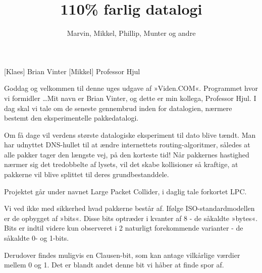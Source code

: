 \documentclass[a4paper,11pt]{article}
\title{110\%  farlig datalogi}
\author{Marvin, Mikkel, Phillip, Munter og andre}
\begin{document}
\maketitle

\begin{roles}
[Klaes] Brian Vinter
[Mikkel] Professor Hjul
\end{roles}

\begin{props}
\end{props}


\begin{sketch}


 Goddag og velkommen til denne uges udgave af »Viden.COM«. Programmet hvor vi formidler \ldots Mit navn er Brian Vinter, og dette er min kollega, Professor Hjul. I dag skal vi tale om de seneste gennembrud inden for datalogien, nærmere bestemt den eksperimentelle pakkedatalogi.

 Om få dage vil verdens største datalogiske eksperiment til dato blive tændt. Man har udnyttet DNS-hullet til at ændre internettets routing-algoritmer, således at alle pakker tager den længste vej, på den korteste tid! Når pakkernes hastighed nærmer sig det tredobbelte af lysets, vil det skabe kollisioner så kraftige, at pakkerne vil blive splittet til deres grundbestanddele.


 Projektet går under navnet Large Packet Collider, i daglig tale forkortet LPC.

 Vi ved ikke med sikkerhed hvad pakkerne består af. Ifølge ISO-standardmodellen er de opbygget af »bits«. Disse bits optræder i kvanter af 8 - de såkaldte »bytes«. Bits er indtil videre kun observeret i 2 naturligt forekommende varianter - de såkaldte 0- og 1-bits.

 Derudover findes muligvis en Clausen-bit, som kan antage vilkårlige værdier mellem 0 og 1. Det er blandt andet denne bit vi håber at finde spor af.


\end{sketch}
\end{document}
